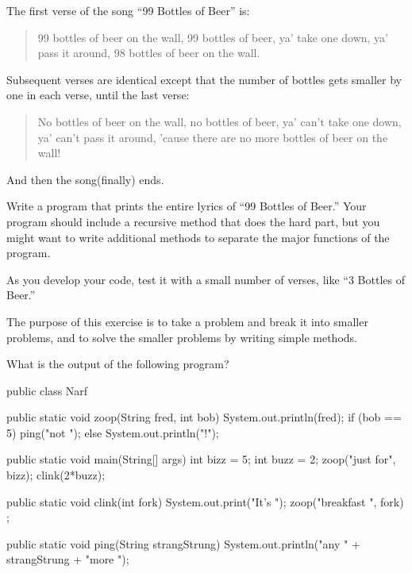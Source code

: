 \begin{exercise}

The first verse of the song ``99 Bottles of Beer'' is:

\begin{quote}
99 bottles of beer on the wall,
99 bottles of beer,
ya' take one down, ya' pass it around,
98 bottles of beer on the wall.
\end{quote}

Subsequent verses are identical except that the number
of bottles gets smaller by one in each verse, until the
last verse:

\begin{quote}
No bottles of beer on the wall,
no bottles of beer,
ya' can't take one down, ya' can't pass it around,
'cause there are no more bottles of beer on the wall!
\end{quote}
%
And then the song(finally) ends.

Write a program that prints the entire lyrics of
``99 Bottles of Beer.''  Your program should include a
recursive method that does the hard part, but you
might want to write additional methods to separate the major
functions of the program.

As you develop your code, test it with a small number of
verses, like ``3 Bottles of Beer.''

The purpose of this exercise is to take a problem and break it
into smaller problems, and to solve the smaller problems by writing
simple methods.
\end{exercise}

\begin{exercise}

What is the output of the following program?

\begin{code}
public class Narf {

    public static void zoop(String fred, int bob) {
        System.out.println(fred);
        if (bob == 5) {
            ping("not ");
        } else {
            System.out.println("!");
        }
    }

    public static void main(String[] args) {
        int bizz = 5;
        int buzz = 2;
        zoop("just for", bizz);
        clink(2*buzz);
    }

    public static void clink(int fork) {
        System.out.print("It's ");
        zoop("breakfast ", fork) ;
    }

    public static void ping(String strangStrung) {
        System.out.println("any " + strangStrung + "more ");
    }
}
\end{code}
\end{exercise}

